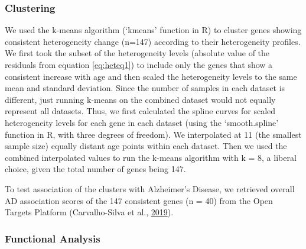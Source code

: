 \documentclass[12pt,twoside]{unicam}
\begin{document}
\hypertarget{clustering}{%
\subsubsection{Clustering}\label{clustering}}

We used the k-means algorithm (`kmeans' function in R) to cluster genes showing consistent heterogeneity change (n=147) according to their heterogeneity profiles. We first took the subset of the heterogeneity levels (absolute value of the residuals from equation \eqref{eq:heteq1}) to include only the genes that show a consistent increase with age and then scaled the heterogeneity levels to the same mean and standard deviation. Since the number of samples in each dataset is different, just running k-means on the combined dataset would not equally represent all datasets. Thus, we first calculated the spline curves for scaled heterogeneity levels for each gene in each dataset (using the `smooth.spline' function in R, with three degrees of freedom). We interpolated at 11 (the smallest sample size) equally distant age points within each dataset. Then we used the combined interpolated values to run the k-means algorithm with k = 8, a liberal choice, given the total number of genes being 147.

To test association of the clusters with Alzheimer's Disease, we retrieved overall AD association scores of the 147 consistent genes (n = 40) from the Open Targets Platform (Carvalho-Silva et al., \protect\hyperlink{ref-Carvalho-Silva2019}{2019}).

\hypertarget{functional-analysis-1}{%
\subsubsection{Functional Analysis}\label{functional-analysis-1}}
\end{document}
